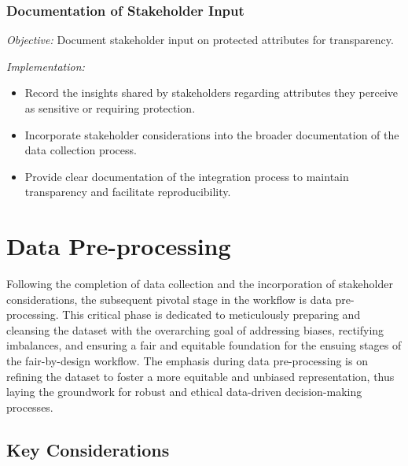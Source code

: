 \documentclass[12pt,a4paper,openright,twoside]{book}
\begin{document}
\subsubsection{Documentation of Stakeholder Input}

\emph{Objective:} Document stakeholder input on protected attributes for transparency.

\emph{Implementation:}

\begin{itemize}

    \item Record the insights shared by stakeholders regarding attributes they perceive as sensitive or requiring protection.

    \item Incorporate stakeholder considerations into the broader documentation of the data collection process.

    \item Provide clear documentation of the integration process to maintain transparency and facilitate reproducibility.

\end{itemize}

\section{Data Pre-processing}
\label{section:pre-proc}

Following the completion of data collection and the incorporation of stakeholder considerations, the subsequent pivotal stage in the workflow is data pre-processing. This critical phase is dedicated to meticulously preparing and cleansing the dataset with the overarching goal of addressing biases, rectifying imbalances, and ensuring a fair and equitable foundation for the ensuing stages of the fair-by-design workflow. The emphasis during data pre-processing is on refining the dataset to foster a more equitable and unbiased representation, thus laying the groundwork for robust and ethical data-driven decision-making processes.

\subsection{Key Considerations}
\end{document}
